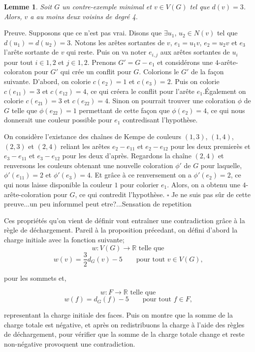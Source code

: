 \documentclass[10pt,a4paper]{article}
\newtheorem{lemme}{Lemme}
\newcommand{\ep}{{\hfill $\square$}}
\begin{document}
\begin{lemme}
Soit $G$ un contre-exemple minimal et $v \in V(G)$ tel que $d(v)=3$. Alors, $v$ a au moins deux voisins de degré 4.
\end{lemme}

Preuve.
Supposons que ce n'est pas vrai. Disons que $\exists u_1$, $u_2 \in N(v)$ tel que $d(u_1) = d(u_2) = 3$. Notons les arêtes sortantes de $v$, $e_1 = u_1v$, $e_2 = u_2v$ et $e_3$ l'arête sortante de $v$ qui reste. Puis on va noter $e_{i,j}$ aux arêtes sortantes de $u_i$ pour tout $i \in {1,2}$ et $j \in {1,2}$. Prenons $G' = G - e_1$ et considérons une $4$-arête-coloraton pour $G'$ qui crée un conflit pour $G$. Colorions le $G'$ de la façon suivante. D'abord, on colorie $c(e_2)=1$ et $c(e_3)=2$. Puis on colorie $c(e_{11})=3$ et $c(e_{12})=4$, ce qui créera le conflit pour l'arête $e_1$.Également on colorie $c(e_{21})=3$ et $c(e_{22})=4$. Sinon on pourrait trouver une coloration $\phi$ de $G$ telle que $\phi(e_{22})=1$ permettant de cette façon que $\phi(e_2)=4$, ce qui nous donnerait une couleur possible pour $e_1$ contredisant l'hypothèse.

On considère l'existance des chaînes de Kempe de couleurs $(1,3)$, $(1,4)$, $(2,3)$ et $(2,4)$ reliant les arêtes $e_2-e_{11}$ et $e_2-e_{12}$ pour les deux premierès et $e_3-e_{11}$ et $e_3-e_{12}$ pour les deux d'après. Regardons la chaîne $(2,4)$ et renversons les couleurs obtenant une nouvelle coloration $\phi'$ de $G$ pour laquelle, $\phi'(e_{11})=2$ et $\phi'(e_{3})=4$. Et grâce à ce renversement on a $\phi'(e_{2})=2$, ce qui nous laisse disponible la couleur $1$ pour colorier $e_1$. Alors, on a obtenu une $4$-arête-coloration pour $G$, ce qui contredit l'hypothèse. 
\ep
{\color{red} Je ne suis pas sûr de cette preuve...un peu informmel peut etre?...Sensation de repetition}

\bigskip
Ces propriétés qu'on vient de définir vont entraîner une contradiction grâce à la règle de déchargement. Pareil à la proposition précedant, on défini d'abord la charge initiale avec la fonction suivante;
$$w: V(G) \to \mathbb{R} \textrm{ telle que} $$
 $$w(v) = \frac{3}{2} d_G(v) - 5 \qquad \textrm{pour tout $v\in V(G)$,}$$

pour les sommets et,

$$w: F \to \mathbb{R} \textrm{ telle que} $$
 $$w(f) = d_G(f) - 5 \qquad \textrm{pour tout $f\in F$,}$$
 
representant la charge initiale des faces. Puis on montre que la somme de la charge totale est négative, et après on redistribuons la charge à l'aide des règles de déchargement, pour vérifier que la somme de la charge totale change et reste non-négative provoquent une contradiction.
\end{document}
